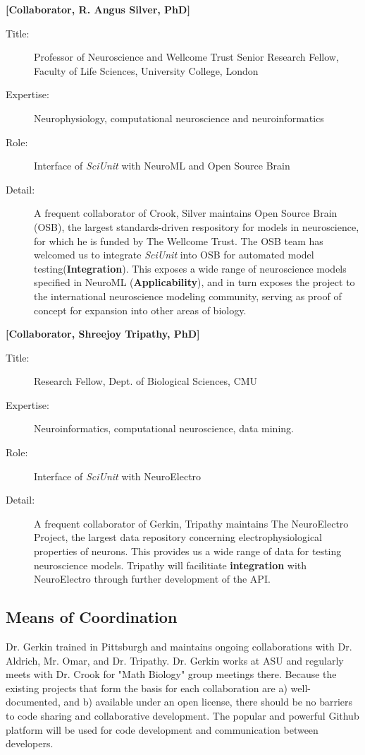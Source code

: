 \documentclass[11pt,letterpaper]{article}
\begin{document}
\textbf{[Collaborator, R. Angus Silver, PhD]}
\begin{description}
\item[Title:] Professor of Neuroscience and Wellcome Trust Senior Research Fellow, Faculty of Life Sciences, University College, London
\item[Expertise:] Neurophysiology, computational neuroscience and neuroinformatics  
\item[Role:] Interface of \textit{SciUnit} with NeuroML and Open Source Brain
\item[Detail:] A frequent collaborator of Crook, Silver maintains Open Source Brain (OSB), the largest standards-driven respository for models in neuroscience, for which he is funded by The Wellcome Trust.  The OSB team has welcomed us to integrate \textit{SciUnit} into OSB for automated model testing(\textbf{Integration}).  This exposes a wide range of neuroscience models specified in NeuroML (\textbf{Applicability}), and in turn exposes the project to the international neuroscience modeling community, serving as proof of concept for expansion into other areas of biology.  
\end{description}
\textbf{[Collaborator, Shreejoy Tripathy, PhD]}
\begin{description}
\item[Title:] Research Fellow, Dept. of Biological Sciences, CMU
\item[Expertise:] Neuroinformatics, computational neuroscience, data mining.    
\item[Role:] Interface of \textit{SciUnit} with NeuroElectro
\item[Detail:] A frequent collaborator of Gerkin, Tripathy maintains The NeuroElectro Project, the largest data repository concerning electrophysiological properties of neurons.  This provides us a wide range of data for testing neuroscience models.  Tripathy will facilitiate \textbf{integration} with NeuroElectro through further development of the API.  
\end{description}

\subsection{Means of Coordination}
Dr. Gerkin trained in Pittsburgh and maintains ongoing collaborations with Dr. Aldrich, Mr. Omar, and Dr. Tripathy.  Dr. Gerkin works at ASU and regularly meets with Dr. Crook for "Math Biology" group meetings there.  Because the existing projects that form the basis for each collaboration are a) well-documented, and b) available under an open license, there should be no barriers to code sharing and collaborative development.  The popular and powerful Github platform will be used for code development and communication between developers.
\end{document}
